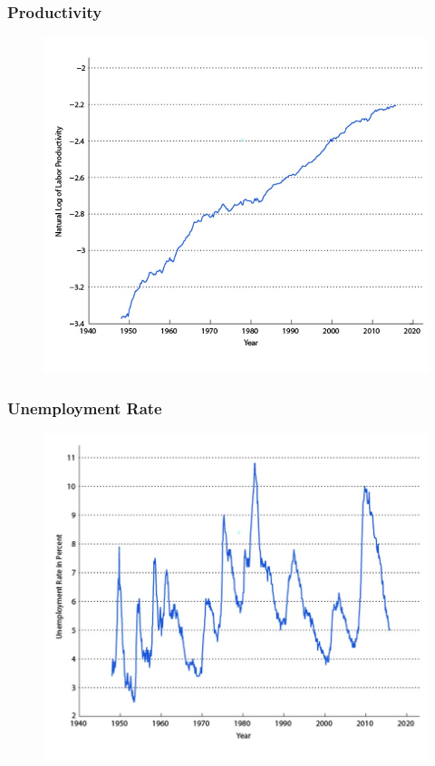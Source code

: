 \documentclass{beamer}
\begin{document}
\begin{frame}
\frametitle[alignment=center]{Productivity}
\begin{figure}
\includegraphics[scale=0.6]{Figures/W_Fig_1pt5.png}
\end{figure}
\end{frame}


\begin{frame}
\frametitle[alignment=center]{Unemployment Rate}
\begin{figure}
\includegraphics[scale=0.6]{Figures/W_Fig_1pt6.png}
\end{figure}
\end{frame}
\end{document}
